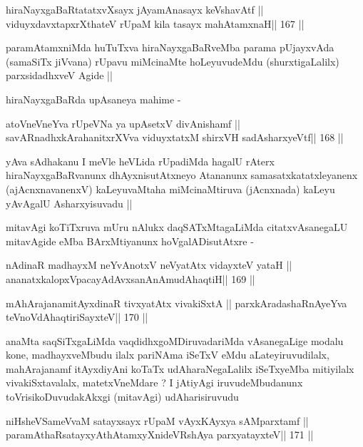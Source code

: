 \begin{shl}
hiraNayxgaBaRtatatxvXsayx jAyamAnasayx keVshavAtf ||
viduyxdavxtapxrXthateV rUpaM kila tasayx mahAtamxnaH\hfill || 167 ||
\end{shl}

\begin{artha}
paramAtamxniMda huTuTxva hiraNayxgaBaRveMba parama pUjayxvAda
(samaSiTx jiVvana) rUpavu miMcinaMte hoLeyuvudeMdu (shurxtigaLalilx)
parxsidadhxveV Agide ||

hiraNayxgaBaRda upAsaneya mahime -
\end{artha}

\begin{shl}
atoV\s neVneYva rUpeVNa ya upAsetxV divAnishamf ||
savARnadhxkArahanitxrXVva viduyxtatxM shirxVH sadA\s\s sharxyeVtf\hfill || 168 ||
\end{shl}

\begin{artha}
yAva sAdhakanu I meVle heVLida rUpadiMda hagalU rAterx
hiraNayxgaBaRvanunx dhAyxnisutAtxneyo Atananunx samasatxkatatxleyanenx
(ajAcnxnavanenxV) kaLeyuvaMtaha miMcinaMtiruva (jAcnxnada) kaLeyu
yAvAgalU Asharxyisuvadu ||
\end{artha}

\begin{artha}
mitavAgi koTiTxruva mUru nAlukx daqSATxMtagaLiMda citatxvAsanegaLU
mitavAgide eMba BArxMtiyanunx hoVgalADisutAtxre -
\end{artha}

\begin{shl}
nA\s\s dinaR madhayxM neYvAnotxV neVyatAtx vidayxteV yataH ||
ananatxkalopxVpacayAdAvxsanAnAmudAhaqtiH\hfill || 169 ||
\end{shl}

\begin{shl}
mAhArajanamitAyxdinaR tivxyatAtx vivakiSxtA ||
parxkAradashaRnAyeYva teVnoVdAhaqtiriSayxteV\hfill || 170 ||
\end{shl}

\begin{artha}
anaMta saqSiTxgaLiMda vaqdidhxgoMDiruvadariMda vAsanegaLige modalu
kone, madhayxveMbudu ilalx pariNAma iSeTxV eMdu aLateyiruvudilalx,
mahArajanamf itAyxdiyAni koTaTx udAharaNegaLalilx iSeTxyeMba
mitiyilalx vivakiSxtavalalx, matetxVneMdare ? I jAtiyAgi
iruvudeMbudanunx toVrisikoDuvudakAkxgi (mitavAgi) udAharisiruvudu
\end{artha}

\begin{shl}
niHsheVSameVvaM satayxsayx rUpaM vAyxKAyxya sAMparxtamf ||
paramAthaRsatayxyAthAtamxyXnideVRshAya parxyatayxteV\hfill || 171 ||
\end{shl}

